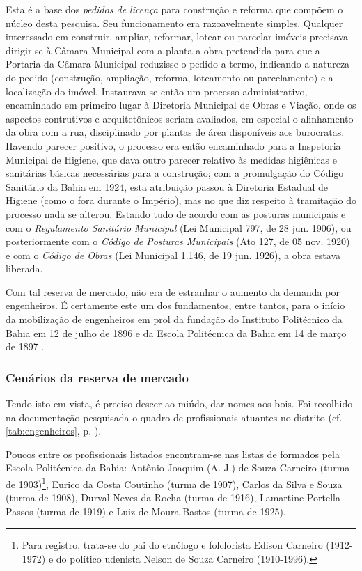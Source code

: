 Esta é a base dos \textit{pedidos de licença} para construção e reforma que compõem o núcleo desta pesquisa. Seu funcionamento era razoavelmente simples. Qualquer interessado em construir, ampliar, reformar, lotear ou parcelar imóveis precisava dirigir-se à Câmara Municipal com a planta a obra pretendida para que a Portaria da Câmara Municipal reduzisse o pedido a termo, indicando a natureza do pedido (construção, ampliação, reforma, loteamento ou parcelamento) e a localização do imóvel. Instaurava-se então um processo administrativo, encaminhado em primeiro lugar à Diretoria Municipal de Obras e Viação, onde os aspectos contrutivos e arquitetônicos seriam avaliados, em especial o alinhamento da obra com a rua, disciplinado por plantas de área disponíveis aos burocratas. Havendo parecer positivo, o processo era então encaminhado para a Inspetoria Municipal de Higiene, que dava outro parecer relativo às medidas higiênicas e sanitárias básicas necessárias para a construção; com a promulgação do Código Sanitário da Bahia em 1924, esta atribuição passou à Diretoria Estadual de Higiene (como o fora durante o Império), mas no que diz respeito à tramitação do processo nada se alterou. Estando tudo de acordo com as posturas municipais e com o \textit{Regulamento Sanitário Municipal} (Lei Municipal 797, de 28 jun. 1906), ou posteriormente com o \textit{Código de Posturas Municipais} (Ato 127, de 05 nov. 1920) e com o \textit{Código de Obras} (Lei Municipal 1.146, de 19 jun. 1926), a obra estava liberada.

Com tal reserva de mercado, não era de estranhar o aumento da demanda por engenheiros. É certamente este um dos fundamentos, entre tantos, para o início da mobilização de engenheiros em prol da fundação do Instituto Politécnico da Bahia em 12 de julho de 1896 e da Escola Politécnica da Bahia em 14 de março de 1897 \cite[pp.~9-11]{costa_politecnica_2005}. 

\subsubsection{Cenários da reserva de mercado}\label{subsubsec:cenresermerc}

Tendo isto em vista, é preciso descer ao miúdo, dar nomes aos bois. Foi recolhido na documentação pesquisada o quadro de profissionais atuantes no distrito (cf. \autoref{tab:engenheiros}, p. \pageref{tab:engenheiros}).

Poucos entre os profissionais listados encontram-se nas listas de formados pela Escola Politécnica da Bahia: Antônio Joaquim (A. J.) de Souza Carneiro (turma de 1903)\footnote{Para registro, trata-se do pai do etnólogo e folclorista Edison Carneiro (1912-1972) e do político udenista Nelson de Souza Carneiro (1910-1996).}, Eurico da Costa Coutinho (turma de 1907), Carlos da Silva e Souza (turma de 1908), Durval Neves da Rocha (turma de 1916), Lamartine Portella Passos (turma de 1919) e Luiz de Moura Bastos (turma de 1925). 

